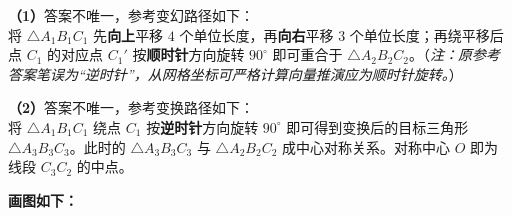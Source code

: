 \textbf{（1）}答案不唯一，参考变幻路径如下：\\
将 $\triangle A_1B_1C_1$ 先\textbf{向上}平移 $4$ 个单位长度，再\textbf{向右}平移 $3$ 个单位长度；再绕平移后点 $C_1$ 的对应点 $C_1'$ 按\textbf{顺时针}方向旋转 $90^\circ$ 即可重合于 $\triangle A_2B_2C_2$。（\textit{注：原参考答案笔误为“逆时针”，从网格坐标可严格计算向量推演应为顺时针旋转。}）

\vspace{0.3cm}
\textbf{（2）}答案不唯一，参考变换路径如下：\\
将 $\triangle A_1B_1C_1$ 绕点 $C_1$ 按\textbf{逆时针}方向旋转 $90^\circ$ 即可得到变换后的目标三角形 $\triangle A_3B_3C_3$。此时的 $\triangle A_3B_3C_3$ 与 $\triangle A_2B_2C_2$ 成中心对称关系。对称中心 $O$ 即为线段 $C_3C_2$ 的中点。

\textbf{画图如下：}

